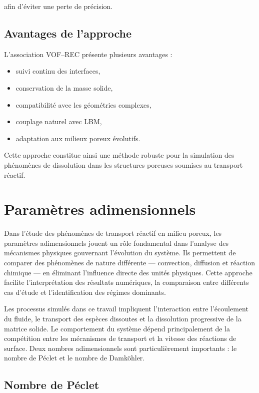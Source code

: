 \documentclass[12pt,a4paper]{report}
\begin{document}
afin d’éviter une perte de précision.

\subsection{Avantages de l’approche}

L’association VOF--REC présente plusieurs avantages :

\begin{itemize}
\item suivi continu des interfaces,
\item conservation de la masse solide,
\item compatibilité avec les géométries complexes,
\item couplage naturel avec LBM,
\item adaptation aux milieux poreux évolutifs.
\end{itemize}

Cette approche constitue ainsi une méthode robuste pour la simulation des phénomènes de dissolution dans les structures poreuses soumises au transport réactif.

\section{Paramètres adimensionnels}

Dans l’étude des phénomènes de transport réactif en milieu poreux, les paramètres adimensionnels jouent un rôle fondamental dans l’analyse des mécanismes physiques gouvernant l’évolution du système. Ils permettent de comparer des phénomènes de nature différente — convection, diffusion et réaction chimique — en éliminant l’influence directe des unités physiques. Cette approche facilite l’interprétation des résultats numériques, la comparaison entre différents cas d’étude et l’identification des régimes dominants.

Les processus simulés dans ce travail impliquent l’interaction entre l’écoulement du fluide, le transport des espèces dissoutes et la dissolution progressive de la matrice solide. Le comportement du système dépend principalement de la compétition entre les mécanismes de transport et la vitesse des réactions de surface. Deux nombres adimensionnels sont particulièrement importants : le nombre de Péclet et le nombre de Damköhler.

\subsection{Nombre de Péclet}
\end{document}
